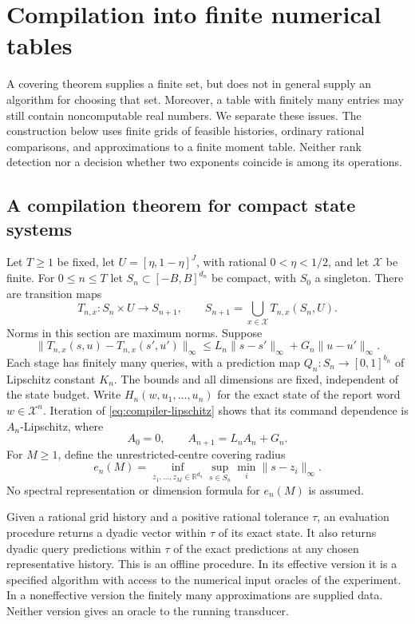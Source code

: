 \section{Compilation into finite numerical tables}\label{sec:effective}
A covering theorem supplies a finite set, but does not in general supply
an algorithm for choosing that set. Moreover, a table with finitely many
entries may still contain noncomputable real numbers. We separate these
issues. The construction below uses finite grids of feasible histories,
ordinary rational comparisons, and approximations to a finite moment
table. Neither rank detection nor a decision whether two exponents
coincide is among its operations.

\subsection{A compilation theorem for compact state systems}
Let $T\ge1$ be fixed, let $U=[\eta,1-\eta]^J$, with rational
$0<\eta<1/2$, and let $\mathcal X$ be finite. For $0\le n\le T$
let $S_n\subset[-B,B]^{d_n}$ be compact, with $S_0$ a singleton.
There are transition maps
\[
 T_{n,x}:S_n\times U\longrightarrow S_{n+1},\qquad
 S_{n+1}=\bigcup_{x\in\mathcal X}T_{n,x}(S_n,U).
\]
Norms in this section are maximum norms. Suppose
\begin{equation}\label{eq:compiler-lipschitz}
 \|T_{n,x}(s,u)-T_{n,x}(s',u')\|_\infty
 \le L_n\|s-s'\|_\infty+G_n\|u-u'\|_\infty.
\end{equation}
Each stage has finitely many queries, with a prediction map
$Q_n:S_n\to[0,1]^{b_n}$ of Lipschitz constant $K_n$.
The bounds and all dimensions are fixed, independent of the state budget.
Write $H_n(w,u_1,\ldots,u_n)$ for the exact state of the report word
$w\in\mathcal X^n$. Iteration of \eqref{eq:compiler-lipschitz} shows that
its command dependence is $A_n$-Lipschitz, where
\[
 A_0=0,\qquad A_{n+1}=L_nA_n+G_n.
\]
For $M\ge1$, define the unrestricted-centre covering radius
\[
 e_n(M)=\inf_{z_1,\ldots,z_M\in\mathbb R^{d_n}}
                  \sup_{s\in S_n}\min_i\|s-z_i\|_\infty.
\]
No spectral representation or dimension formula for $e_n(M)$ is assumed.

\begin{definition}\label{def:finite-data}
Given a rational grid history and a positive rational tolerance $\tau$,
an evaluation procedure returns a dyadic vector within $\tau$ of its
exact state. It also returns dyadic query predictions within $\tau$ of
the exact predictions at any chosen representative history. This is an
offline procedure. In its effective version it is a specified algorithm
with access to the numerical input oracles of the experiment. In a
noneffective version the finitely many approximations are supplied data.
Neither version gives an oracle to the running transducer.
\end{definition}

